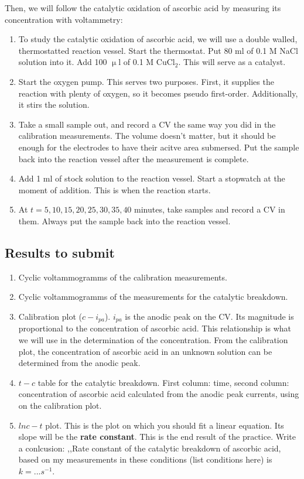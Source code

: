 Then, we will follow the catalytic oxidation of ascorbic acid by measuring its concentration with voltammetry:

\begin{enumerate}
\item To study the catalytic oxidation of ascorbic acid, we will use a double walled, thermostatted reaction vessel. Start the thermostat. Put 80 ml of 0.1 M NaCl solution into it. Add 100 $\upmu$l of 0.1 M CuCl$_2$. This will serve as a catalyst.
\item Start the oxygen pump. This serves two purposes. First, it supplies the reaction with plenty of oxygen, so it becomes pseudo first-order. Additionally, it stirs the solution.
\item Take a small sample out, and record a CV the same way you did in the calibration measurements. The volume doesn't matter, but it should be enough for the electrodes to have their acitve area submersed. Put the sample back into the reaction vessel after the measurement is complete.
\item Add 1 ml of stock solution to the reaction vessel. Start a stopwatch at the moment of addition. This is when the reaction starts.
\item At $t = 5, 10, 15, 20, 25, 30, 35, 40$ minutes, take samples and record a CV in them. Always put the sample back into the reaction vessel.
\end{enumerate}

\subsection{Results to submit}

\begin{enumerate}
\item Cyclic voltammogramms of the calibration measurements.
\item Cyclic voltammogramms of the measurements for the catalytic breakdown.
\item Calibration plot ($c - i_{pa}$). $i_{pa}$ is the anodic peak on the CV. Its magnitude is proportional to the concentration of ascorbic acid. This relationship is what we will use in the determination of the concentration. From the calibration plot, the concentration of ascorbic acid in an unknown solution can be determined from the anodic peak.
\item $t - c$ table for the catalytic breakdown. First column: time, second column: concentration of ascorbic acid calculated from the anodic peak currents, using on the calibration plot.
\item $lnc - t$ plot. This is the plot on which you should fit a linear equation. Its slope will be the \textbf{rate constant}. This is the end result of the practice. Write a conlcusion: ,,Rate constant of the catalytic breakdown of ascorbic acid, based on my measurements in these conditions (list conditions here) is $k = ... s^{-1}$.
\end{enumerate}
